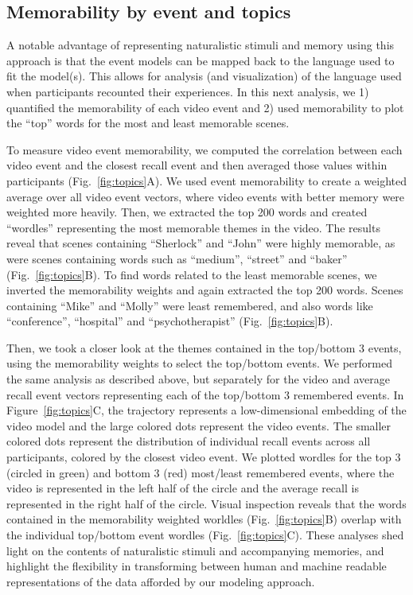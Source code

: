 

\subsection*{Memorability by event and topics}
A notable advantage of representing naturalistic stimuli and memory using this approach is that the event models can be mapped back to the language used to fit the model(s).  This allows for analysis (and visualization) of the language used when participants recounted their experiences.  In this next analysis, we 1) quantified the memorability of each video event and 2) used memorability to plot the ``top'' words for the most and least memorable scenes.

To measure video event memorability, we computed the correlation between each video event and the closest recall event and then averaged those values within participants (Fig.~\ref{fig:topics}A). We used event memorability to create a weighted average over all video event vectors, where video events with better memory were weighted more heavily. Then, we extracted the top 200 words and created ``wordles'' representing the most memorable themes in the video. The results reveal that scenes containing ``Sherlock'' and ``John'' were highly memorable, as were scenes containing words such as ``medium'', ``street'' and ``baker'' (Fig.~\ref{fig:topics}B). To find words related to the least memorable scenes, we inverted the memorability weights and again extracted the top 200 words.  Scenes containing ``Mike'' and ``Molly'' were least remembered, and also words like ``conference'', ``hospital'' and ``psychotherapist'' (Fig.~\ref{fig:topics}B).

Then, we took a closer look at the themes contained in the top/bottom 3 events, using the memorability weights to select the top/bottom events. We performed the same analysis as described above, but separately for the video and average recall event vectors representing each of the top/bottom 3 remembered events. In Figure~\ref{fig:topics}C, the trajectory represents a low-dimensional embedding of the video model and the large colored dots represent the video events. The smaller colored dots represent the distribution of individual recall events across all participants, colored by the closest video event. We plotted wordles for the top 3 (circled in green) and bottom 3 (red) most/least remembered events, where the video is represented in the left half of the circle and the average recall is represented in the right half of the circle. Visual inspection reveals that the words contained in the memorability weighted worldles (Fig.~\ref{fig:topics}B) overlap with the individual top/bottom event wordles (Fig.~\ref{fig:topics}C). These analyses shed light on the contents of naturalistic stimuli and accompanying memories, and highlight the flexibility in transforming between human and machine readable representations of the data afforded by our modeling approach.

